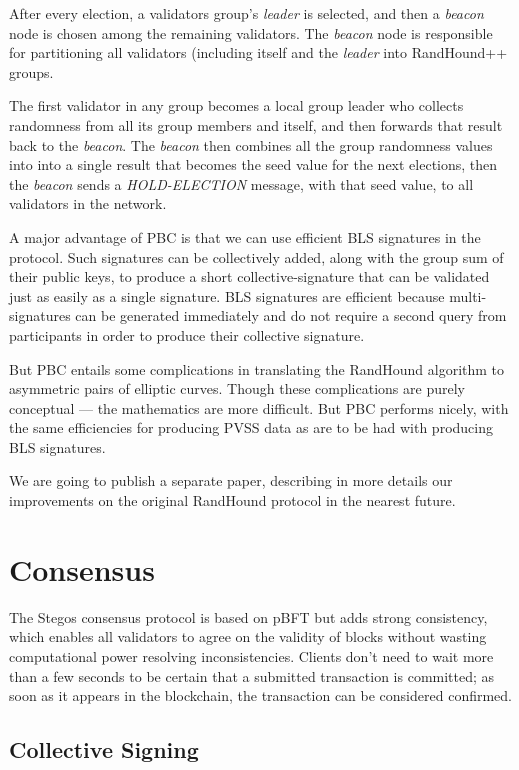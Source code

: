 \documentclass[a4paper, 10pt, conference]{ieeeconf}
\begin{document}
After every election, a validators group's \textit{leader} is selected, and then a \textit{beacon} node is chosen among the remaining validators. The \textit{beacon} node is responsible for partitioning all validators (including itself and the \textit{leader} into RandHound++ groups. 

The first validator in any group becomes a local group leader who collects randomness from all its group members and itself, and then forwards that result back to the \textit{beacon}. The \textit{beacon} then combines all the group randomness values into into a single result that becomes the seed value for the next elections, then the \textit{beacon} sends a \textit{HOLD-ELECTION} message, with that seed value, to all validators in the network.

A major advantage of PBC is that we can use efficient BLS signatures\cite{c16} in the protocol. Such signatures can be collectively added, along with the group sum of their public keys, to produce a short collective-signature that can be validated just as easily as a single signature. BLS signatures are efficient because multi-signatures can be generated immediately and do not require a second query from participants in order to produce their collective signature.

But PBC entails some complications in translating the RandHound algorithm to asymmetric pairs of elliptic curves. Though these complications are purely conceptual --- the mathematics are more difficult. But PBC performs nicely, with the same efficiencies for producing PVSS data as are to be had with producing BLS signatures.

We are going to publish a separate paper, describing in more details our improvements on the original RandHound protocol in the nearest future.

\section{Consensus}\label{consensus}

The Stegos consensus protocol is based on pBFT\cite{c9} but adds strong consistency, which enables all validators to agree on the validity of blocks without wasting computational power resolving inconsistencies. Clients don’t need to wait more than a few seconds to be certain that a submitted transaction is committed; as soon as it appears in the blockchain, the transaction can be considered confirmed. 

\subsection{Collective Signing}
\end{document}
